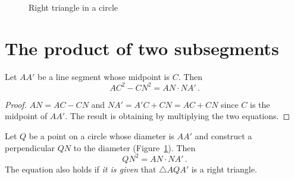 \begin{figure}[t]
\begin{minipage}{.50\textwidth}
\begin{center}
\caption{Right triangle in a circle}\label{f.circle-besant}
\end{center}
\end{minipage}
\end{figure}


\section{The product of two subsegments}

\begin{theorem}\label{thm.dividing}
Let $AA'$ be a line segment whose midpoint is $C$. Then 
\[
AC^2-CN^2=AN\cdot NA'\,.
\]
\end{theorem}

\begin{center}
\end{center}

\begin{proof}
$AN=AC-CN$ and $NA'=A'C+CN=AC+CN$ since $C$ is the midpoint of $AA'$. The result is obtaining by multiplying the two equations.\hqed
\end{proof}


\begin{theorem}\label{thm.alt-hypo}
Let $Q$ be a point on a circle whose diameter is $AA'$ and construct a perpendicular $QN$ to the diameter (Figure~\ref{f.circle-besant}). Then
\[
QN^2=AN\cdot NA'\,.
\]
The equation also holds if \emph{it is given} that $\triangle AQA'$ is a right triangle.
\end{theorem}

